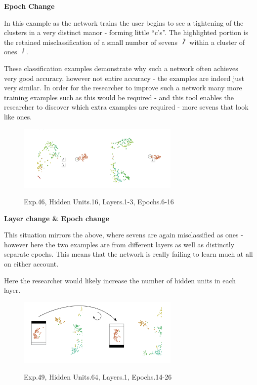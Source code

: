 \documentclass[a4paper,11pt,titlepage]{article}
\begin{document}
	\textbf{Epoch Change}
	\par 
	In this example as the network trains the user begins to see a tightening of the clusters in a very distinct manor - forming little ``c's''. The highlighted portion is the retained misclassification of a small number of sevens {\includegraphics[width=0.4cm]{img/seven_one-01.png}}  within a cluster of ones {\includegraphics[width=0.4cm]{img/seven_one-02.png}}.
	\par 
	These classification examples demonstrate why such a network often achieves very good accuracy, however not entire accuracy - the examples are indeed just very similar. In order for the researcher to improve such a network many more training examples such as this would be required - and this tool enables the researcher to discover which extra examples are required - more sevens that look like ones.

	\begin{figure}[H]
    			\centering	
			{{\includegraphics[width=0.7\textwidth]
    				{img/conc_X46_H16_L1-3_E6-16.png} 
    			}}%
    			\caption{Exp.46, Hidden Units.16, Layers.1-3, Epochs.6-16}%
    		\label{fig:mnistHinton}
	\end{figure}
	
	\textbf{Layer change \& Epoch change}
	\par 
	This situation mirrors the above, where sevens are again misclassified as ones - however here the two examples are from different layers as well as distinctly separate epochs. This means that the network is really failing to learn much at all on either account. 
	\par 
	Here the researcher would likely increase the number of hidden units in each layer.


	\begin{figure}[H]
    			\centering	
			{{\includegraphics[width=0.7\textwidth]
    				{img/conc_X49_H64_L1_E14-26.png} 
    			}}%
    			\caption{Exp.49, Hidden Units.64, Layers.1, Epochs.14-26}%
    		\label{fig:mnistHinton}
	\end{figure}
	
\end{document}
